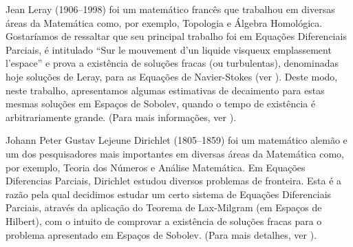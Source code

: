 Jean Leray (1906--1998) foi um matemático francês que trabalhou em diversas áreas da Matemática como, por exemplo, Topologia e Álgebra Homológica.
Gostaríamos de ressaltar que seu principal trabalho foi em Equações Diferenciais Parciais, é intitulado ``Sur le mouvement d'un liquide visqueux emplassement l'espace'' e prova a existência de soluções fracas (ou turbulentas), denominadas hoje soluções de Leray, para as Equações de Navier-Stokes  (ver \cite{leray-fluid}). Deste modo, neste trabalho, apresentamos algumas estimativas de decaimento  para estas mesmas soluções em Espaços de Sobolev, quando o tempo de existência é arbitrariamente grande. (Para mais informações, ver \cite{leray}).

Johann Peter Gustav Lejeune Dirichlet (1805--1859) foi um matemático alemão e um dos pesquisadores mais importantes em diversas áreas da Matemática como, por exemplo, Teoria dos Números e Análise Matemática. Em Equações Diferencias Parciais, Dirichlet estudou diversos problemas de fronteira. Esta é a razão pela qual decidimos estudar um certo sistema de Equações Diferenciais Parciais, através da aplicação do Teorema de Lax-Milgram (em Espaços de Hilbert), com o intuito de comprovar a existência de soluções fracas para o problema apresentado em Espaços de Sobolev. (Para mais detalhes, ver \cite{dirichlet}).

